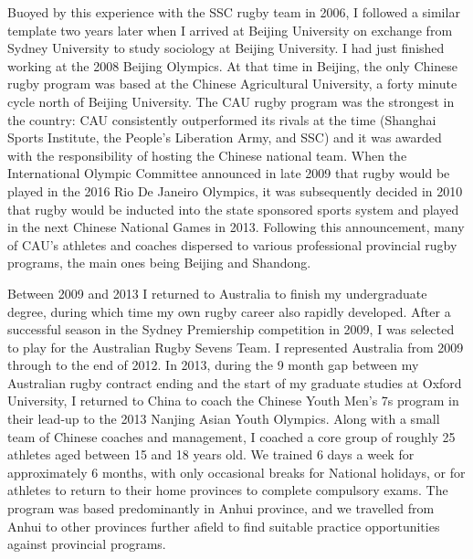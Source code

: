 \begin{CJK}{UTF8}{gbsn}
  Buoyed by this experience with the SSC rugby team in 2006, I followed a similar template two years later when I arrived at Beijing University on exchange from Sydney University to study sociology at Beijing University.  I had just finished working at the 2008 Beijing Olympics. At that time in Beijing, the only Chinese rugby program was based at the Chinese Agricultural University, a forty minute cycle north of Beijing University.  The CAU rugby program was the strongest in the country: CAU consistently outperformed its rivals at the time (Shanghai Sports Institute, the People's Liberation Army, and SSC) and it was awarded with the responsibility of hosting the Chinese national team.  When the International Olympic Committee announced in late 2009 that rugby would be played in the 2016 Rio De Janeiro Olympics, it was subsequently decided in 2010 that rugby would be inducted into the state sponsored sports system and played in the next Chinese National Games in 2013.  Following this announcement, many of CAU's athletes and coaches dispersed to various professional provincial rugby programs, the main ones being Beijing and Shandong.


  Between 2009 and 2013 I returned to Australia to finish my undergraduate degree, during which time my own rugby career also rapidly developed.  After a successful season in the Sydney Premiership competition in 2009, I was selected to play for the Australian Rugby Sevens Team. I represented Australia from 2009 through to the end of 2012.  In 2013, during the 9 month gap between my Australian rugby contract ending and the start of my graduate studies at Oxford University, I returned to China to coach the Chinese Youth Men's 7s program in their lead-up to the 2013 Nanjing Asian Youth Olympics.  Along with a small team of Chinese coaches and management, I coached a core group of roughly 25 athletes aged between 15 and 18 years old. We trained 6 days a week for approximately 6 months, with only occasional breaks for National holidays, or for athletes to return to their home provinces to complete compulsory exams.  The program was based predominantly in Anhui province, and we travelled from Anhui to other provinces further afield to find suitable practice opportunities against provincial programs.


\end{CJK}
